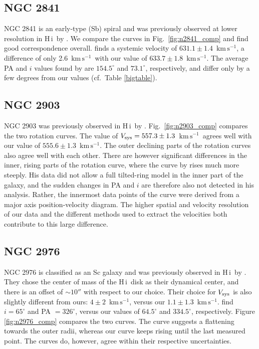\documentclass[usenatbib,usegraphicx,apjfonts,floatfix]{emulateapj}
\newcommand{\kms}{\ensuremath{\,\mbox{km}\,\mbox{s}^{-1}}}
\newcommand{\HI}{H\,{\sc i}}
\begin{document}
\subsection{NGC 2841}

NGC 2841 is an early-type (Sb) spiral and was previously observed at
lower resolution in \HI\ by \citet{begeman87}.  We compare the curves
in Fig.\ \ref{fig:n2841_comp} and find good correspondence overall.
\citet{begeman87} finds a systemic velocity of $631.1 \pm 1.4$ \kms, a
difference of only 2.6 \kms\ with our value of $633.7 \pm 1.8$
\kms. The average PA and $i$ values found by \citet{begeman87} are
$154.5^{\circ}$ and $73.1^{\circ}$, respectively, and differ only by a
few degrees from our values (cf.\ Table \ref{bigtable}).

\subsection{NGC 2903}

NGC 2903 was previously observed in \HI\ by \citet{begeman87}.
Fig.\ \ref{fig:n2903_comp} compares the two rotation curves.  The
\citet{begeman87} value of $V_{\rm sys} = 557.3 \pm 1.3$ \kms\ agrees
well with our value of $555.6 \pm 1.3$ \kms.  The outer declining
parts of the rotation curves also agree well with each other.  There
are however significant differences in the inner, rising parts of the
rotation curve, where the curve by \citet{begeman87} rises much more
steeply.  His data did not allow a full tilted-ring model in the inner
part of the galaxy, and the sudden changes in PA and $i$ are therefore
also not detected in his analysis. Rather, the innermost data points
of the \citet{begeman87} curve were derived from a major axis
position-velocity diagram.  The higher spatial and velocity resolution
of our data and the different methods used to extract the velocities
both contribute to this large difference.



\subsection{NGC 2976}

NGC 2976 is classified as an Sc galaxy and was previously observed in
\HI\ by \citet{stil}.  They chose the center of mass of the \HI\ disk as
their dynamical center, and there is an offset of $\sim 10''$ with
respect to our choice. Their choice for $V_{\rm sys}$ is also slightly
different from ours: $4\pm 2$ \kms, versus our $1.1 \pm 1.3$ \kms.
\citet{stil} find $i=65^{\circ}$ and PA $= 326^{\circ}$, versus our
values of $64.5^{\circ}$ and $334.5^{\circ}$, respectively.  Figure
\ref{fig:n2976_comp} compares the two curves.  The \citet{stil} curve
suggests a flattening towards the outer radii, whereas our curve keeps
rising until the last measured point. The curves do, however, agree
within their respective uncertainties.
\end{document}
